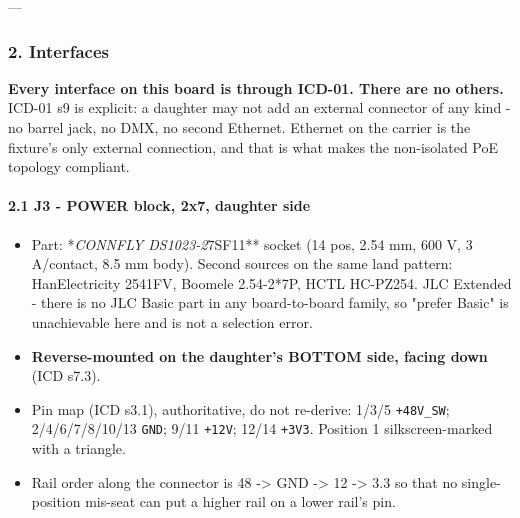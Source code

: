 \documentclass[11pt,a4paper]{article}
\begin{document}
---

\subsubsection*{2. Interfaces}
\textbf{Every interface on this board is through ICD-01. There are no others.} ICD-01 s9 is explicit: a daughter may not add an external connector of any kind - no barrel jack, no DMX, no second Ethernet. Ethernet on the carrier is the fixture's only external connection, and that is what makes the non-isolated PoE topology compliant.

\paragraph*{2.1 J3 - POWER block, 2x7, daughter side}
\begin{itemize}
\item Part: {*}\emph{CONNFLY DS1023-2}7SF11{*}{*} socket (14 pos, 2.54 mm, 600 V,
3 A/contact, 8.5 mm body). Second sources on the same land pattern:
HanElectricity 2541FV, Boomele 2.54-2{*}7P, HCTL HC-PZ254. JLC Extended -
there is no JLC Basic part in any board-to-board family, so "prefer Basic"
is unachievable here and is not a selection error.
\item \textbf{Reverse-mounted on the daughter's BOTTOM side, facing down} (ICD s7.3).
\item Pin map (ICD s3.1), authoritative, do not re-derive:
1/3/5 \texttt{+48V\_SW}; 2/4/6/7/8/10/13 \texttt{GND}; 9/11 \texttt{+12V}; 12/14 \texttt{+3V3}.
Position 1 silkscreen-marked with a triangle.
\item Rail order along the connector is 48 -\textgreater{} GND -\textgreater{} 12 -\textgreater{} 3.3 so that no
single-position mis-seat can put a higher rail on a lower rail's pin.
\end{itemize}
\end{document}
